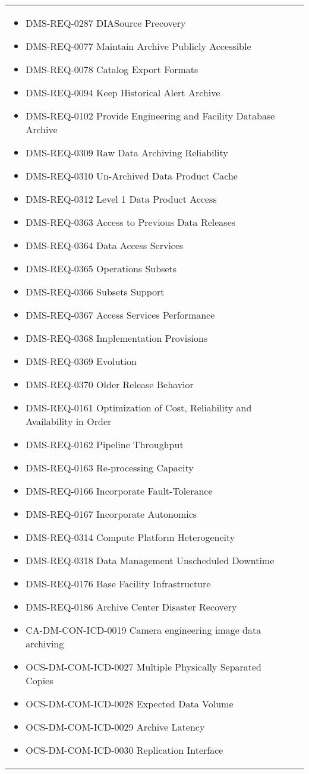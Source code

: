 \begin{xtabular}{lp{0.7\textwidth}}
\begin{itemize}
\item DMS-REQ-0287 DIASource Precovery
\item DMS-REQ-0077 Maintain Archive Publicly Accessible
\item DMS-REQ-0078 Catalog Export Formats
\item DMS-REQ-0094 Keep Historical Alert Archive
\item DMS-REQ-0102 Provide Engineering and Facility Database Archive
\item DMS-REQ-0309 Raw Data Archiving Reliability
\item DMS-REQ-0310 Un-Archived Data Product Cache
\item DMS-REQ-0312 Level 1 Data Product Access
\item DMS-REQ-0363 Access to Previous Data Releases
\item DMS-REQ-0364 Data Access Services
\item DMS-REQ-0365 Operations Subsets
\item DMS-REQ-0366 Subsets Support
\item DMS-REQ-0367 Access Services Performance
\item DMS-REQ-0368 Implementation Provisions
\item DMS-REQ-0369 Evolution
\item DMS-REQ-0370 Older Release Behavior
\item DMS-REQ-0161 Optimization of Cost, Reliability and Availability in Order
\item DMS-REQ-0162 Pipeline Throughput
\item DMS-REQ-0163 Re-processing Capacity
\item DMS-REQ-0166 Incorporate Fault-Tolerance
\item DMS-REQ-0167 Incorporate Autonomics
\item DMS-REQ-0314 Compute Platform Heterogeneity
\item DMS-REQ-0318 Data Management Unscheduled Downtime
\item DMS-REQ-0176 Base Facility Infrastructure
\item DMS-REQ-0186 Archive Center Disaster Recovery
\item CA-DM-CON-ICD-0019 Camera engineering image data archiving
\item OCS-DM-COM-ICD-0027 Multiple Physically Separated Copies
\item OCS-DM-COM-ICD-0028 Expected Data Volume
\item OCS-DM-COM-ICD-0029 Archive Latency
\item OCS-DM-COM-ICD-0030 Replication Interface

\end{itemize}
\end{xtabular}
